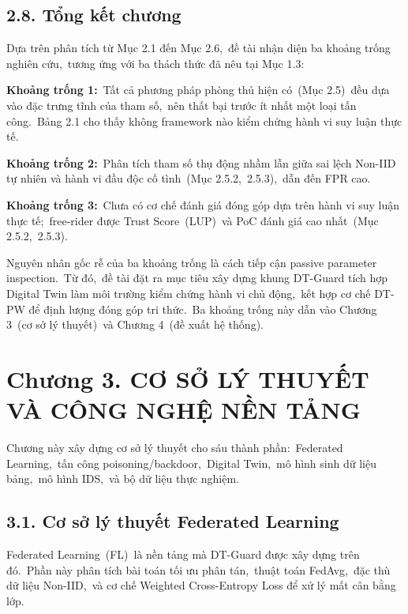 \subsection{2.8. Tổng kết chương}\label{tux1ed5ng-kux1ebft-chux1b0ux1a1ng}

Dựa trên phân tích từ Mục 2.1 đến Mục 2.6,~đề tài nhận diện ba khoảng trống nghiên cứu,~tương ứng với ba thách thức đã nêu tại Mục 1.3:

\textbf{Khoảng trống 1:}~Tất cả phương pháp phòng thủ hiện có~(Mục 2.5)~đều dựa vào đặc trưng tĩnh của tham số,~nên thất bại trước ít nhất một loại tấn công.~Bảng 2.1 cho thấy không framework nào kiểm chứng hành vi suy luận thực tế.

\textbf{Khoảng trống 2:}~Phân tích tham số thụ động nhầm lẫn giữa sai lệch Non-IID tự nhiên và hành vi đầu độc cố tình~(Mục 2.5.2,~2.5.3),~dẫn đến FPR cao.

\textbf{Khoảng trống 3:}~Chưa có cơ chế đánh giá đóng góp dựa trên hành vi suy luận thực tế;~free-rider được Trust Score~(LUP)~và PoC đánh giá cao nhất~(Mục 2.5.2,~2.5.3).

Nguyên nhân gốc rễ của ba khoảng trống là cách tiếp cận passive parameter inspection.~Từ đó,~đề tài đặt ra mục tiêu xây dựng khung DT-Guard tích hợp Digital Twin làm môi trường kiểm chứng hành vi chủ động,~kết hợp cơ chế DT-PW để định lượng đóng góp tri thức.~Ba khoảng trống này dẫn vào Chương 3~(cơ sở lý thuyết)~và Chương 4~(đề xuất hệ thống).

\section{Chương 3. CƠ SỞ LÝ THUYẾT VÀ CÔNG NGHỆ NỀN TẢNG}\label{chux1b0ux1a1ng-3.-cux1a1-sux1edf-luxfd-thuyux1ebft-vuxe0-cuxf4ng-nghux1ec7-nux1ec1n-tux1ea3ng}

Chương này xây dựng cơ sở lý thuyết cho sáu thành phần:~Federated Learning,~tấn công poisoning/backdoor,~Digital Twin,~mô hình sinh dữ liệu bảng,~mô hình IDS,~và bộ dữ liệu thực nghiệm.

\subsection{3.1. Cơ sở lý thuyết Federated Learning}\label{cux1a1-sux1edf-luxfd-thuyux1ebft-federated-learning}

Federated Learning~(FL)~là nền tảng mà DT-Guard được xây dựng trên đó.~Phần này phân tích bài toán tối ưu phân tán,~thuật toán FedAvg,~đặc thù dữ liệu Non-IID,~và cơ chế Weighted Cross-Entropy Loss để xử lý mất cân bằng lớp.

